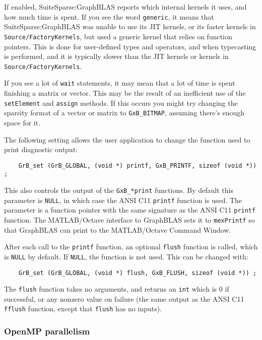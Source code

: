 If enabled, SuiteSparse:GraphBLAS reports which internal kernels it uses, and
how much time is spent.  If you see the word \verb'generic', it means that
SuiteSparse:GraphBLAS was unable to use its JIT kernels, or its faster kernels
in \verb'Source/FactoryKernels', but used a generic kernel that relies on
function pointers.  This is done for user-defined types and operators, and when
typecasting is performed, and it is typically slower than the JIT kernels
or kernels in \verb'Source/FactoryKernels'.

If you see a lot of \verb'wait' statements, it may mean that a lot of time is
spent finishing a matrix or vector.  This may be the result of an inefficient
use of the \verb'setElement' and \verb'assign' methods.  If this occurs you
might try changing the sparsity format of a vector or matrix to
\verb'GxB_BITMAP', assuming there's enough space for it.

The following setting allows the user application to change the
function used to print diagnostic output:

{\small
\begin{verbatim}
    GrB_set (GrB_GLOBAL, (void *) printf, GxB_PRINTF, sizeof (void *)) ; \end{verbatim} }

This also controls the output of the
\verb'GxB_*print' functions.  By default this parameter is \verb'NULL', in
which case the ANSI C11 \verb'printf' function is used.  The parameter is a
function pointer with the same signature as the ANSI C11 \verb'printf'
function.  The MATLAB/Octave interface to GraphBLAS sets it to \verb'mexPrintf'
so that GraphBLAS can print to the MATLAB/Octave Command Window.

After each call to the \verb'printf' function, an optional
\verb'flush' function is called, which is \verb'NULL' by default.  If
\verb'NULL', the function is not used.  This can be changed with:

{\small
\begin{verbatim}
    GrB_set (GrB_GLOBAL, (void *) flush, GxB_FLUSH, sizeof (void *)) ; \end{verbatim} }

The \verb'flush' function takes no
arguments, and returns an \verb'int' which is 0 if successful, or any nonzero
value on failure (the same output as the ANSI C11 \verb'fflush' function,
except that \verb'flush' has no inputs).

\subsubsection{OpenMP parallelism}
\label{omp_parallelism}

